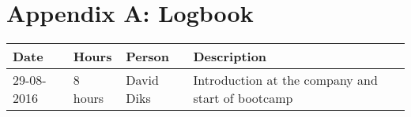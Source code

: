 \section{Appendix A: Logbook}
\begin{tabular}{|l|l|l|l|}
	\hline
	\textbf{Date} & \textbf{Hours} & \textbf{Person} & \textbf{Description} \\
	\hline
	29-08-2016 & 8 hours & David Diks & Introduction at the company and start of bootcamp \\ \hline
\end{tabular}